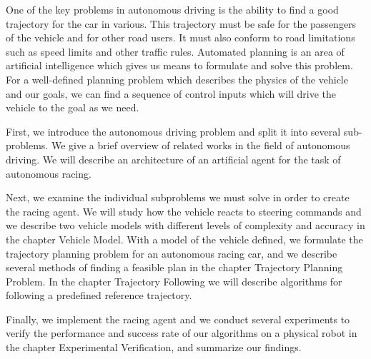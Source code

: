 One of the key problems in autonomous driving is the ability to find a good trajectory for the car in various. This trajectory must be safe for the passengers of the vehicle and for other road users. It must also conform to road limitations such as speed limits and other traffic rules. Automated planning is an area of artificial intelligence which gives us means to formulate and solve this problem. For a well-defined planning problem which describes the physics of the vehicle and our goals, we can find a sequence of control inputs which will drive the vehicle to the goal as we need.

First, we introduce the autonomous driving problem and split it into several sub-problems. We give a brief overview of related works in the field of autonomous driving. We will describe an architecture of an artificial agent for the task of autonomous racing.

Next, we examine the individual subproblems we must solve in order to create the racing agent. We will study how the vehicle reacts to steering commands and we describe two vehicle models with different levels of complexity and accuracy in the chapter Vehicle Model. With a model of the vehicle defined, we formulate the trajectory planning problem for an autonomous racing car, and we describe several methods of finding a feasible plan in the chapter Trajectory Planning Problem. In the chapter Trajectory Following we will describe algorithms for following a predefined reference trajectory.

Finally, we implement the racing agent and we conduct several experiments to verify the performance and success rate of our algorithms on a physical robot in the chapter Experimental Verification, and summarize our findings.
